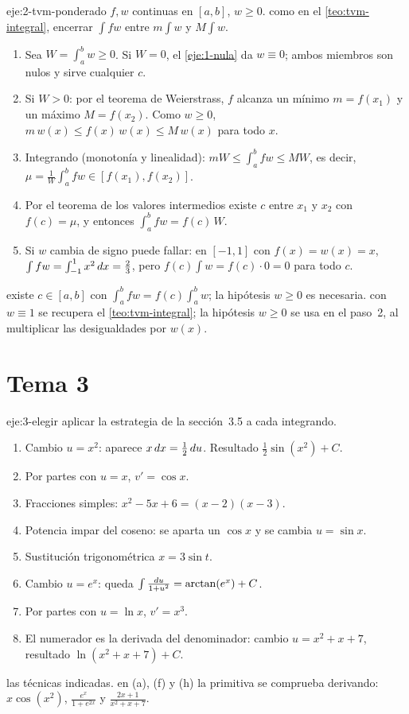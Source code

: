 \begin{solucion}{eje:2-tvm-ponderado}
\datos $f,w$ continuas en $[a,b]$, $w\ge0$.
\planteamiento como en el \cref{teo:tvm-integral}, encerrar $\int fw$ entre $m\int w$ y $M\int w$.
\pasos
\begin{enumerate}[label=\arabic*.]
  \item Sea $W=\int_a^bw\ge0$. Si $W=0$, el \cref{eje:1-nula} da $w\equiv0$; ambos miembros son nulos y sirve cualquier $c$.
  \item Si $W>0$: por el teorema de Weierstrass, $f$ alcanza un mínimo $m=f(x_1)$ y un máximo $M=f(x_2)$. Como $w\ge0$, $m\,w(x)\le f(x)\,w(x)\le M\,w(x)$ para todo $x$.
  \item Integrando (monotonía y linealidad): $mW\le\int_a^bfw\le MW$, es decir, $\mu=\frac1W\int_a^bfw\in[f(x_1),f(x_2)]$.
  \item Por el teorema de los valores intermedios existe $c$ entre $x_1$ y $x_2$ con $f(c)=\mu$, y entonces $\int_a^bfw=f(c)\,W$.
  \item Si $w$ cambia de signo puede fallar: en $[-1,1]$ con $f(x)=w(x)=x$, $\int fw=\int_{-1}^{1}x^{2}\mathop{}\!d x=\frac23$, pero $f(c)\int w=f(c)\cdot0=0$ para todo $c$.
\end{enumerate}
\resultado existe $c\in[a,b]$ con $\int_a^bfw=f(c)\int_a^bw$; la hipótesis $w\ge0$ es necesaria.
\comprobacion con $w\equiv1$ se recupera el \cref{teo:tvm-integral}; la hipótesis $w\ge0$ se usa en el paso~2, al multiplicar las desigualdades por $w(x)$.
\end{solucion}

\section{Tema 3}

\begin{solucion}{eje:3-elegir}
\planteamiento aplicar la estrategia de la sección~3.5 a cada integrando.
\pasos
\begin{enumerate}[label=(\alph*)]
  \item Cambio $u=x^{2}$: aparece $x\mathop{}\!d x=\frac12\mathop{}\!d u$. Resultado $\frac12\sin(x^{2})+C$.
  \item Por partes con $u=x$, $v'=\cos x$.
  \item Fracciones simples: $x^{2}-5x+6=(x-2)(x-3)$.
  \item Potencia impar del coseno: se aparta un $\cos x$ y se cambia $u=\sin x$.
  \item Sustitución trigonométrica $x=3\sin t$.
  \item Cambio $u=e^{x}$: queda $\int\frac{\mathop{}\!d u}{1+u^{2}}=\arctan(e^{x})+C$.
  \item Por partes con $u=\ln x$, $v'=x^{3}$.
  \item El numerador es la derivada del denominador: cambio $u=x^{2}+x+7$, resultado $\ln(x^{2}+x+7)+C$.
\end{enumerate}
\resultado las técnicas indicadas.
\comprobacion en (a), (f) y (h) la primitiva se comprueba derivando: $x\cos(x^{2})$, $\frac{e^{x}}{1+e^{2x}}$ y $\frac{2x+1}{x^{2}+x+7}$.
\end{solucion}


